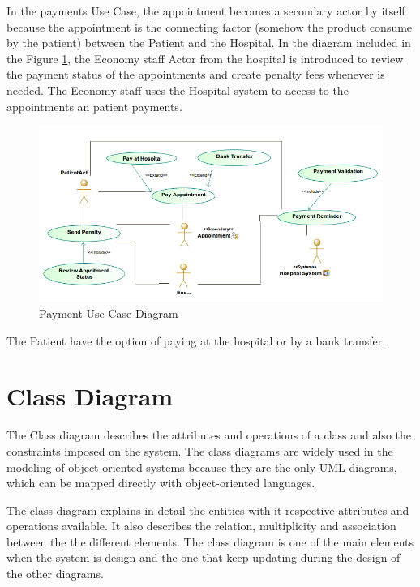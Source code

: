\documentclass{article}
\begin{document}
            In the payments Use Case, the appointment becomes a secondary actor by itself because the appointment is the connecting factor (somehow the product consume by the patient) between the Patient and the
            Hospital. In the diagram included in the Figure  \ref{fig:payment}, the Economy staff Actor from the hospital is introduced to review the payment status of the appointments and create penalty fees whenever is needed.
            The Economy staff uses the Hospital system to access to the appointments an patient payments.

            \begin{figure}[H]
                \centering 
                \includegraphics[width=1\linewidth]{./img/payments.png}
                \caption{Payment Use Case Diagram}
                \label{fig:payment}
            \end{figure}

            The Patient have the option of paying at the hospital or by a bank transfer.
            
            \section{Class Diagram} 
            The Class diagram describes the attributes and operations of a class and also the constraints 
            imposed on the system. The class diagrams are widely used in the modeling of object oriented 
            systems because they are the only UML diagrams, which can be mapped directly with object-oriented languages.
            
            The class diagram explains in detail the entities with it respective attributes and operations available. It also describes the relation, multiplicity and
            association between the the different elements. The class diagram is one of the main elements when the system is design and the one that keep updating during the 
            design of the other diagrams.
\end{document}
